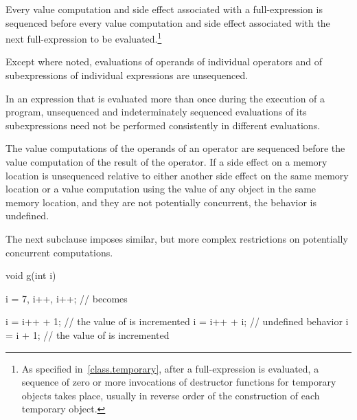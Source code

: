 \pnum
Every
%
value computation and
%
side effect associated with a full-expression is
sequenced before every value computation and side effect associated with the
next full-expression to be evaluated.\footnote{As specified
in~\ref{class.temporary}, after a full-expression is evaluated, a sequence of
zero or more invocations of destructor functions for temporary objects takes
place, usually in reverse order of the construction of each temporary object.}

\pnum
{}%
Except where noted, evaluations of operands of individual operators and
of subexpressions of individual expressions are unsequenced.
\begin{note}
In an expression that is evaluated more than once during the execution
of a program, unsequenced and indeterminately sequenced evaluations of
its subexpressions need not be performed consistently in different
evaluations.
\end{note}
The value computations of the operands of an
operator are sequenced before the value computation of the result of the
operator. If a
%
side effect on a memory location is unsequenced
relative to either another side effect on the same memory location or
a value computation using the value of any object in the same memory location,
and they are not potentially concurrent,
the behavior is undefined.
\begin{note}
The next subclause imposes similar, but more complex restrictions on
potentially concurrent computations.
\end{note}

\begin{example}
\begin{codeblock}
void g(int i) {
  i = 7, i++, i++;              //  becomes 

  i = i++ + 1;                  // the value of  is incremented
  i = i++ + i;                  // undefined behavior
  i = i + 1;                    // the value of  is incremented
}
\end{codeblock}
\end{example}

